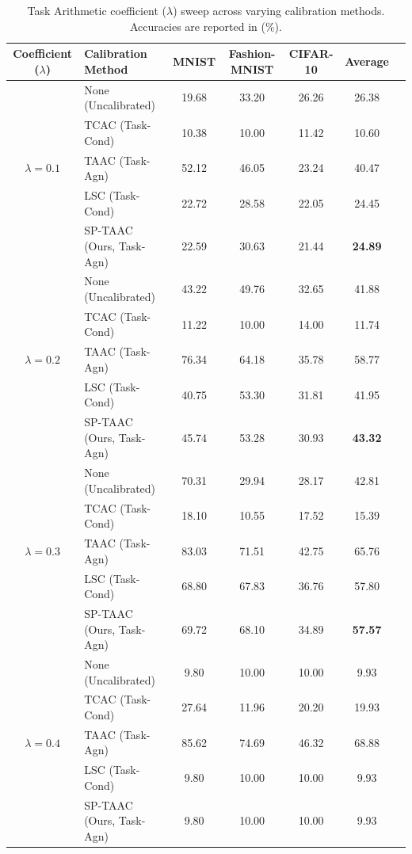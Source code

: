 \documentclass{article}
\theoremstyle{plain}
\theoremstyle{definition}
\theoremstyle{remark}
\begin{document}
\begin{table}[t]
\caption{Task Arithmetic coefficient ($\lambda$) sweep across varying calibration methods. Accuracies are reported in (\%).}
\label{tab:lambda_sweep}
\begin{center}
\begin{tabular}{c|l|ccccc}
\toprule
\textbf{Coefficient ($\lambda$)} & \textbf{Calibration Method} & \textbf{MNIST} & \textbf{Fashion-MNIST} & \textbf{CIFAR-10} & \textbf{Average} \\
\midrule
& None (Uncalibrated) & 19.68 & 33.20 & 26.26 & 26.38 \\
& TCAC (Task-Cond) & 10.38 & 10.00 & 11.42 & 10.60 \\
$\lambda = 0.1$ & TAAC (Task-Agn) & 52.12 & 46.05 & 23.24 & 40.47 \\
& LSC (Task-Cond) & 22.72 & 28.58 & 22.05 & 24.45 \\
& SP-TAAC (Ours, Task-Agn) & 22.59 & 30.63 & 21.44 & \textbf{24.89} \\
\midrule
& None (Uncalibrated) & 43.22 & 49.76 & 32.65 & 41.88 \\
& TCAC (Task-Cond) & 11.22 & 10.00 & 14.00 & 11.74 \\
$\lambda = 0.2$ & TAAC (Task-Agn) & 76.34 & 64.18 & 35.78 & 58.77 \\
& LSC (Task-Cond) & 40.75 & 53.30 & 31.81 & 41.95 \\
& SP-TAAC (Ours, Task-Agn) & 45.74 & 53.28 & 30.93 & \textbf{43.32} \\
\midrule
& None (Uncalibrated) & 70.31 & 29.94 & 28.17 & 42.81 \\
& TCAC (Task-Cond) & 18.10 & 10.55 & 17.52 & 15.39 \\
$\lambda = 0.3$ & TAAC (Task-Agn) & 83.03 & 71.51 & 42.75 & 65.76 \\
& LSC (Task-Cond) & 68.80 & 67.83 & 36.76 & 57.80 \\
& SP-TAAC (Ours, Task-Agn) & 69.72 & 68.10 & 34.89 & \textbf{57.57} \\
\midrule
& None (Uncalibrated) & 9.80 & 10.00 & 10.00 & 9.93 \\
& TCAC (Task-Cond) & 27.64 & 11.96 & 20.20 & 19.93 \\
$\lambda = 0.4$ & TAAC (Task-Agn) & 85.62 & 74.69 & 46.32 & 68.88 \\
& LSC (Task-Cond) & 9.80 & 10.00 & 10.00 & 9.93 \\
& SP-TAAC (Ours, Task-Agn) & 9.80 & 10.00 & 10.00 & 9.93 \\
\bottomrule
\end{tabular}
\end{center}
\end{table}
\end{document}
